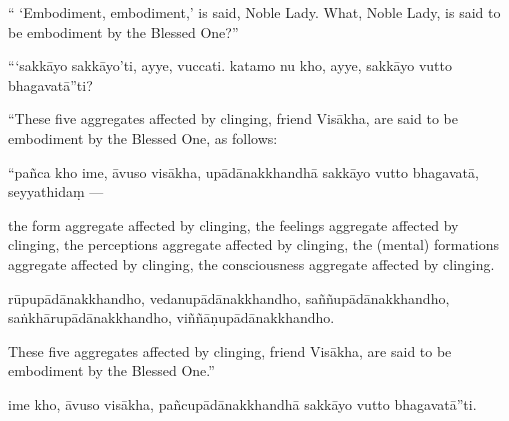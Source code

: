 \begin{samepage}
\begin{leftcolumn*}
“ ‘Embodiment, embodiment,’ is said, Noble Lady. What, Noble Lady, is said to be embodiment by the Blessed One?”
\end{leftcolumn*}

\begin{rightcolumn}
“‘sakkāyo sakkāyo’ti, ayye, vuccati. katamo nu kho, ayye, sakkāyo vutto bhagavatā”ti?
\end{rightcolumn}
\end{samepage}

\begin{samepage}
\begin{leftcolumn*}
“These five aggregates affected by clinging, friend Visākha, are said to be embodiment by the Blessed One, as follows:
\end{leftcolumn*}

\begin{rightcolumn}
“pañca kho ime, āvuso visākha, upādānakkhandhā sakkāyo vutto bhagavatā, seyyathidaṃ —
\end{rightcolumn}
\end{samepage}

\begin{samepage}
\begin{leftcolumn*}
the form aggregate affected by clinging, the feelings aggregate affected by clinging, the perceptions aggregate affected by clinging, the (mental) formations aggregate affected by clinging, the consciousness aggregate affected by clinging.
\end{leftcolumn*}

\begin{rightcolumn}
rūpupādānakkhandho, vedanupādānakkhandho, saññupādānakkhandho, saṅkhārupādānakkhandho, viññāṇupādānakkhandho.
\end{rightcolumn}
\end{samepage}

\begin{samepage}
\begin{leftcolumn*}
These five aggregates affected by clinging, friend Visākha, are said to be embodiment by the Blessed One.”
\end{leftcolumn*}

\begin{rightcolumn}
ime kho, āvuso visākha, pañcupādānakkhandhā sakkāyo vutto bhagavatā”ti.
\end{rightcolumn}
\end{samepage}

